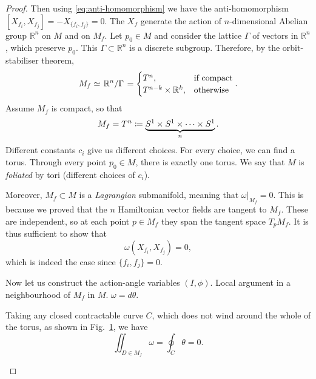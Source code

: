 
\begin{proof}
  Then using \eqref{eq:anti-homomorphism} we have the anti-homomorphism $ [X_{f_i}, X_{f_j}] = -X_{\{f_i, f_j\}} = 0 $.
  The $X_f$ generate the action of $n$-dimensional Abelian group $\mathbb{R}^n$ on $M$ and on $M_f$. 
  Let $p_0 \in M$ and consider the lattice $\Gamma$ of vectors in $\mathbb{R}^n$, which preserve $p_0$.
  This $\Gamma \subset \mathbb{R}^n$ is a discrete subgroup. Therefore, by the orbit-stabiliser theorem, 
  \begin{equation} 
    M_f \simeq \flatfrac{\mathbb{R}^n}{\Gamma} = 
    \begin{cases}
      T^n, & \text{if compact} \\
      T^{n-k} \times \mathbb{R}^k, & \text{otherwise}  
    \end{cases}.
  \end{equation}
  Assume $M_f$ is compact, so that
  \begin{equation}
    M_f = T^n \coloneqq \underbrace{S^1 \times S^1 \times \dots \times S^1}_{\mathclap{n}}.
  \end{equation}
  Different constants $c_i$ give us different choices. For every choice, we can find a torus.
  Through every point $p_0 \in M$, there is exactly one torus. We say that $M$ is \emph{foliated} by tori (different choices of $c_i$).
  
  Moreover, $M_f \subset M$ is a \emph{Lagrangian} submanifold, meaning that $\omega \rvert_{M_f} = 0$.
  This is because we proved that the $n$ Hamiltonian vector fields are tangent to $M_f$. These are independent, so at each point $p \in M_f$ they span the tangent space $T_p M_f$.
  It is thus sufficient to show that
  \begin{equation}
    \omega (X_{f_i}, X_{f_j}) = 0,
  \end{equation}
  which is indeed the case since $\{f_i, f_j\} = 0$.
  
  Now let us construct the action-angle variables $(I, \phi)$.
  Local argument in a neighbourhood of $M_f$ in $M$.
  $\omega = d \theta$.
  
  Taking any closed contractable curve $C$, which does not wind around the whole of the torus, as shown in Fig.~\ref{fig:l9f2}, we have
  \begin{equation}
    \iint_{D \in M_f} \omega = \oint_C \theta = 0.
  \end{equation}
  \begin{figure}[tbhp]
    \centering
    \def\svgwidth{0.4\columnwidth}
    
    \caption{}
    \label{fig:l9f2}
  \end{figure}
  

\end{proof}
